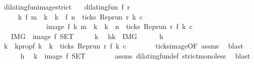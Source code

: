 \begin{isabellebody}
\begin{isamarkuptext}
\end{isamarkuptext}\isamarkuptrue%
\isamarkupfalse%
\ dilating{\isacharunderscore}fun{\isacharunderscore}image{\isacharunderscore}strict{\isacharcolon}\isanewline
\ \ \ {\isacartoucheopen}dilating{\isacharunderscore}fun\ f\ r{\isacartoucheclose}\isanewline
\ \ \ \ \ {\isacartoucheopen}{\isacharbraceleft}k{\isachardot}\ f\ m\ {\isacharless}\ k\ {\isasymand}\ k\ {\isacharless}\ f\ n\ {\isasymand}\ ticks\ {\isacharparenleft}{\isacharparenleft}Rep{\isacharunderscore}run\ r{\isacharparenright}\ k\ c{\isacharparenright}{\isacharbraceright}\isanewline
\ \ \ \ \ \ \ \ \ \ \ \ {\isacharequal}\ image\ f\ {\isacharbraceleft}k{\isachardot}\ m\ {\isacharless}\ k\ {\isasymand}\ k\ {\isacharless}\ n\ {\isasymand}\ ticks\ {\isacharparenleft}{\isacharparenleft}Rep{\isacharunderscore}run\ r{\isacharparenright}\ {\isacharparenleft}f\ k{\isacharparenright}\ c{\isacharparenright}{\isacharbraceright}{\isacartoucheclose}\isanewline
\ \ {\isacharparenleft}\ {\isacartoucheopen}{\isacharquery}IMG\ {\isacharequal}\ image\ f\ {\isacharquery}SET{\isacartoucheclose}{\isacharparenright}\isanewline
%
\isadelimproof
%
\endisadelimproof
%
\isatagproof
{}\isamarkupfalse%
\isanewline
\ \ \isacommand{{\isacharbraceleft}}\isamarkupfalse%
\ \isamarkupfalse%
\ k\ \isamarkupfalse%
\ h{\isacharcolon}{\isacartoucheopen}k\ {\isasymin}\ {\isacharquery}IMG{\isacartoucheclose}\isanewline
\ \ \ \ \isamarkupfalse%
\ h\ \isamarkupfalse%
\ k\ \ k{}prop{\isacharcolon}{\isacartoucheopen}f\ k\ {\isacharequal}\ k\ {\isasymand}\ ticks\ {\isacharparenleft}{\isacharparenleft}Rep{\isacharunderscore}run\ r{\isacharparenright}\ {\isacharparenleft}f\ k\ c{\isacharparenright}{\isacartoucheclose}\isanewline
\ \ \ \ \ \ \isamarkupfalse%
\ ticks{\isacharunderscore}image{\isacharbrackleft}OF\ assms{\isacharbrackright}\ \isamarkupfalse%
\ blast\isanewline
\ \ \ \ \isamarkupfalse%
\ h\ \isamarkupfalse%
\ {\isacartoucheopen}k\ {\isasymin}\ image\ f\ {\isacharquery}SET{\isacartoucheclose}\isanewline
\ \ \ \ \ \ \isamarkupfalse%
\ assms\ dilating{\isacharunderscore}fun{\isacharunderscore}def\ strict{\isacharunderscore}mono{\isacharunderscore}less\ \isamarkupfalse%
\ blast\isanewline
\ \ \isacommand{{\isacharbraceright}}\isamarkupfalse%

\end{isabellebody}
